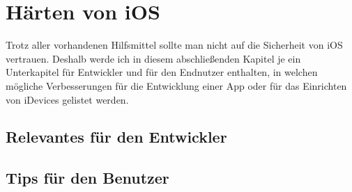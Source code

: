 \section{Härten von iOS}
	Trotz aller vorhandenen Hilfsmittel sollte man nicht auf die Sicherheit von iOS
	vertrauen. Deshalb werde ich in diesem abschließenden Kapitel je ein
	Unterkapitel für Entwickler und für den Endnutzer enthalten, in welchen
	mögliche Verbesserungen für die Entwicklung einer App oder für das Einrichten
	von iDevices gelistet werden.
	\subsection{Relevantes für den Entwickler}
		
	\subsection{Tips für den Benutzer}
